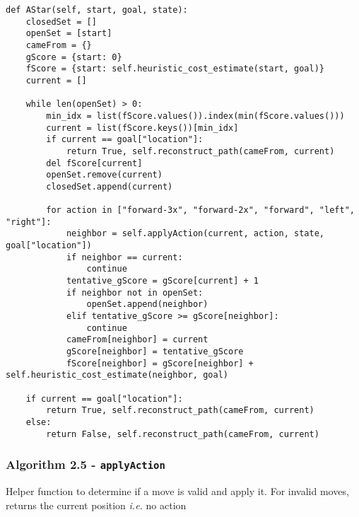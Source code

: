 \documentclass[12pt, letterpaper]{article}
\begin{document}
\begin{mdframed}[backgroundcolor=shadecolor]
\begin{verbatim}
def AStar(self, start, goal, state):    
    closedSet = []
    openSet = [start]
    cameFrom = {}
    gScore = {start: 0}
    fScore = {start: self.heuristic_cost_estimate(start, goal)}
    current = []
    
    while len(openSet) > 0:
        min_idx = list(fScore.values()).index(min(fScore.values()))
        current = list(fScore.keys())[min_idx]
        if current == goal["location"]:
            return True, self.reconstruct_path(cameFrom, current)
        del fScore[current]
        openSet.remove(current)
        closedSet.append(current)
        
        for action in ["forward-3x", "forward-2x", "forward", "left", "right"]:
            neighbor = self.applyAction(current, action, state, goal["location"])
            if neighbor == current:
                continue
            tentative_gScore = gScore[current] + 1
            if neighbor not in openSet:
                openSet.append(neighbor)
            elif tentative_gScore >= gScore[neighbor]:
                continue
            cameFrom[neighbor] = current
            gScore[neighbor] = tentative_gScore
            fScore[neighbor] = gScore[neighbor] + self.heuristic_cost_estimate(neighbor, goal)
        
    if current == goal["location"]:
        return True, self.reconstruct_path(cameFrom, current)
    else:
        return False, self.reconstruct_path(cameFrom, current)
\end{verbatim}
\end{mdframed}

\subsubsection{Algorithm 2.5 - \texttt{applyAction}}

Helper function to determine if a move is valid and apply it. For invalid moves, returns the current position \textit{i.e.} no action
\end{document}
